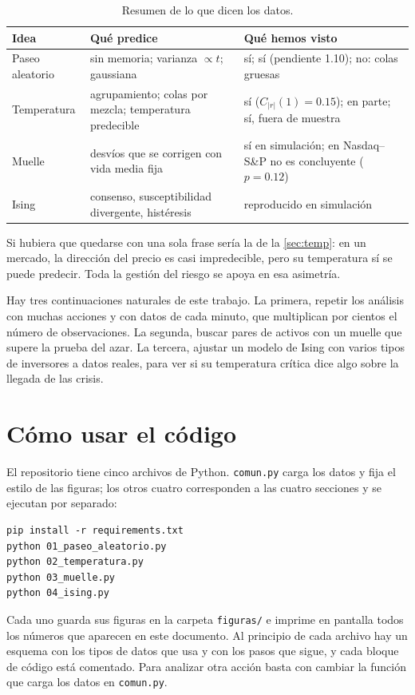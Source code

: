 \documentclass[11pt,a4paper]{article}
\begin{document}
\begin{table}[ht]
\centering\small
\caption{Resumen de lo que dicen los datos.}
\label{tab:resumen}
\begin{tabular}{@{}p{3.3cm}p{5.2cm}p{5.0cm}@{}}
\toprule
Idea & Qué predice & Qué hemos visto\\
\midrule
Paseo aleatorio & sin memoria; varianza $\propto t$; gaussiana & sí; sí (pendiente 1.10); no: colas gruesas\\
Temperatura & agrupamiento; colas por mezcla; temperatura predecible & sí ($C_{|r|}(1)=0.15$); en parte; sí, fuera de muestra\\
Muelle & desvíos que se corrigen con vida media fija & sí en simulación; en Nasdaq--S\&P no es concluyente ($p=0.12$)\\
Ising & consenso, susceptibilidad divergente, histéresis & reproducido en simulación\\
\bottomrule
\end{tabular}
\end{table}

Si hubiera que quedarse con una sola frase sería la de la \cref{sec:temp}: en un mercado, la dirección del
precio es casi impredecible, pero su temperatura sí se puede predecir. Toda la gestión del riesgo se
apoya en esa asimetría.

Hay tres continuaciones naturales de este trabajo. La primera, repetir los análisis con muchas acciones y
con datos de cada minuto, que multiplican por cientos el número de observaciones. La segunda, buscar
pares de activos con un muelle que supere la prueba del azar. La tercera, ajustar un modelo de Ising con
varios tipos de inversores a datos reales, para ver si su temperatura crítica dice algo sobre la llegada de
las crisis.

\appendix
\section{Cómo usar el código}

El repositorio tiene cinco archivos de Python. \texttt{comun.py} carga los datos y fija el estilo de las
figuras; los otros cuatro corresponden a las cuatro secciones y se ejecutan por separado:
\begin{verbatim}
pip install -r requirements.txt
python 01_paseo_aleatorio.py
python 02_temperatura.py
python 03_muelle.py
python 04_ising.py
\end{verbatim}
Cada uno guarda sus figuras en la carpeta \texttt{figuras/} e imprime en pantalla todos los números que
aparecen en este documento. Al principio de cada archivo hay un esquema con los tipos de datos que usa y
con los pasos que sigue, y cada bloque de código está comentado. Para analizar otra acción basta con
cambiar la función que carga los datos en \texttt{comun.py}.



\end{document}
